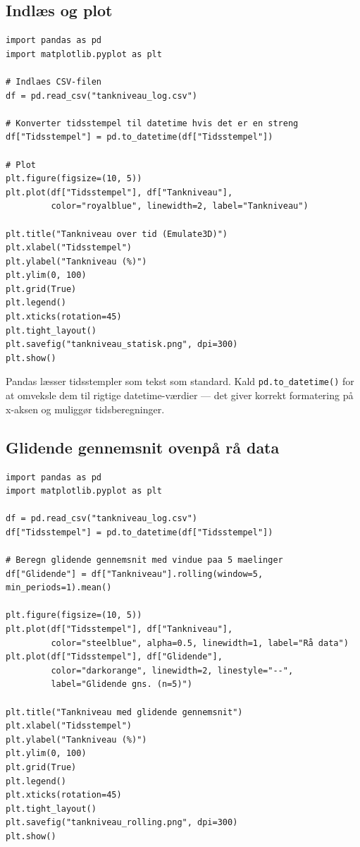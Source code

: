 \documentclass[12pt, a4paper]{article}
\begin{document}
\subsection{Indlæs og plot}

\begin{tcolorbox}[pythonbox, title={\faPython\quad Kode 1 --- Statisk plot af tankniveau fra CSV}]
\begin{verbatim}
import pandas as pd
import matplotlib.pyplot as plt

# Indlaes CSV-filen
df = pd.read_csv("tankniveau_log.csv")

# Konverter tidsstempel til datetime hvis det er en streng
df["Tidsstempel"] = pd.to_datetime(df["Tidsstempel"])

# Plot
plt.figure(figsize=(10, 5))
plt.plot(df["Tidsstempel"], df["Tankniveau"],
         color="royalblue", linewidth=2, label="Tankniveau")

plt.title("Tankniveau over tid (Emulate3D)")
plt.xlabel("Tidsstempel")
plt.ylabel("Tankniveau (%)")
plt.ylim(0, 100)
plt.grid(True)
plt.legend()
plt.xticks(rotation=45)
plt.tight_layout()
plt.savefig("tankniveau_statisk.png", dpi=300)
plt.show()
\end{verbatim}
\end{tcolorbox}

\begin{tcolorbox}[tipbox, title={\faLightbulb\quad Tip --- \texttt{pd.to\_datetime()}}]
Pandas læsser tidsstempler som tekst som standard. Kald
\texttt{pd.to\_datetime()} for at omveksle dem til rigtige datetime-værdier
--- det giver korrekt formatering på x-aksen og muliggør tidsberegninger.
\end{tcolorbox}

\subsection{Glidende gennemsnit ovenpå rå data}

\begin{tcolorbox}[pythonbox, title={\faPython\quad Kode 2 --- Rå data + glidende gennemsnit}]
\begin{verbatim}
import pandas as pd
import matplotlib.pyplot as plt

df = pd.read_csv("tankniveau_log.csv")
df["Tidsstempel"] = pd.to_datetime(df["Tidsstempel"])

# Beregn glidende gennemsnit med vindue paa 5 maelinger
df["Glidende"] = df["Tankniveau"].rolling(window=5, min_periods=1).mean()

plt.figure(figsize=(10, 5))
plt.plot(df["Tidsstempel"], df["Tankniveau"],
         color="steelblue", alpha=0.5, linewidth=1, label="Rå data")
plt.plot(df["Tidsstempel"], df["Glidende"],
         color="darkorange", linewidth=2, linestyle="--",
         label="Glidende gns. (n=5)")

plt.title("Tankniveau med glidende gennemsnit")
plt.xlabel("Tidsstempel")
plt.ylabel("Tankniveau (%)")
plt.ylim(0, 100)
plt.grid(True)
plt.legend()
plt.xticks(rotation=45)
plt.tight_layout()
plt.savefig("tankniveau_rolling.png", dpi=300)
plt.show()
\end{verbatim}
\end{tcolorbox}
\end{document}
